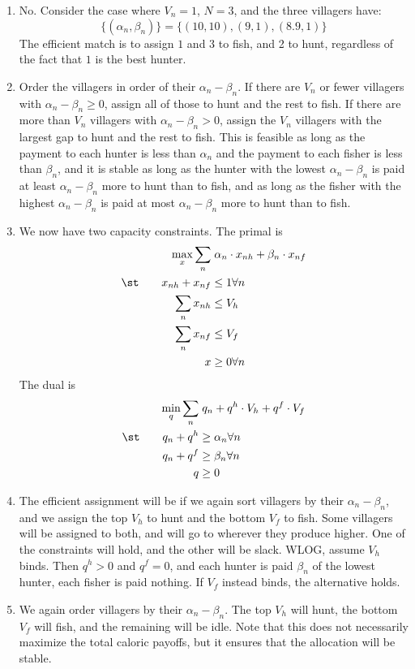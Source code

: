 \documentclass[10pt]{article}
\begin{document}
\begin{enumerate}
	\item No. Consider the case where $V_n = 1$, $N = 3$, and the three villagers have: \[\{(\alpha_n,\beta_n)\} = \{(10,10),(9,1),(8.9,1)\}\]The efficient match is to assign $1$ and $3$ to fish, and 2 to hunt, regardless of the fact that $1$ is the best hunter.
	\item Order the villagers in order of their $\alpha_n - \beta_n$. If there are $V_n$ or fewer villagers with $\alpha_n - \beta_n \ge 0$, assign all of those to hunt and the rest to fish. If there are more than $V_n$ villagers with $\alpha_n - \beta_n > 0$, assign the $V_n$ villagers with the largest gap to hunt and the rest to fish. This is feasible as long as the payment to each hunter is less than $\alpha_n$ and the payment to each fisher is less than $\beta_n$, and it is stable as long as the hunter with the lowest $\alpha_n-\beta_n$ is paid at least $\alpha_n - \beta_n$ more to hunt than to fish, and as long as the fisher with the highest $\alpha_n-\beta_n$ is paid at most $\alpha_n - \beta_n$ more to hunt than to fish.
	\item We now have two capacity constraints. The primal is \begin{align*} \max_x \sum_n &\; \alpha_n \cdot x_{nh} + \beta_n \cdot x_{nf} \\ \st \qquad x_{nh} + x_{nf} &\le 1 \forall n \\ \sum_n x_{nh} &\le V_h \\ \sum_n x_{nf} &\le V_f \\ x &\ge 0 \forall n \end{align*}The dual is \begin{align*} \min_q \sum_n &\; q_n + q^h \cdot V_h + q^f \cdot V_f \\ \st \qquad q_n + q^h &\ge \alpha_n \forall n \\ q_n + q^f &\ge \beta_n \forall n \\ q &\ge 0 \end{align*}
	\item The efficient assignment will be if we again sort villagers by their $\alpha_n - \beta_n$, and we assign the top $V_h$ to hunt and the bottom $V_f$ to fish. Some villagers will be assigned to both, and will go to wherever they produce higher. One of the constraints will hold, and the other will be slack. WLOG, assume $V_h$ binds. Then $q^h > 0$ and $q^f = 0$, and each hunter is paid $\beta_n$ of the lowest hunter, each fisher is paid nothing. If $V_f$ instead binds, the alternative holds.
	\item We again order villagers by their $\alpha_n - \beta_n$. The top $V_h$ will hunt, the bottom $V_f$ will fish, and the remaining will be idle. Note that this does not necessarily maximize the total caloric payoffs, but it ensures that the allocation will be stable. 
\end{enumerate}
\end{document}
